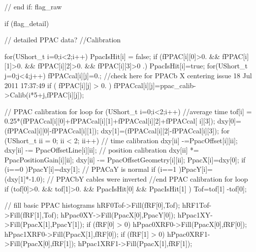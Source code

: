 \begin{DoxyCode}
{{{{{{{{{{        } // end if: flag_raw
        
        if (flag_detail) { // detailed PPAC data?
          //Calibration 
          
          for(UShort_t i=0;i<2;i++){
          PpacIsHit[i] = false;
          if (fPPAC[i][0]>0. && fPPAC[i][1]>0. && fPPAC[i][2]>0. && fPPAC[i][3]>0
      .) PpacIsHit[i]=true;
            for(UShort_t j=0;j<4;j++){
              fPPACcal[i][j]=0.;
              //check here for PPACb X centering issue 18 Jul 2011 17:37:49 
              if ( fPPAC[i][j] > 0. )  {
                fPPACcal[i][j]=ppac_calib->Calib(i*5+j,fPPAC[i][j]);
              }
            }    
          }

          // PPAC calibration for loop
          for (UShort_t i=0;i<2;i++){
            //average time
            tof[i] = 0.25*(fPPACcal[i][0]+fPPACcal[i][1]+fPPACcal[i][2]+fPPACcal[
      i][3]);
            dxy[0]=(fPPACcal[i][0]-fPPACcal[i][1]);
            dxy[1]=(fPPACcal[i][2]-fPPACcal[i][3]);
            for (UShort_t ii = 0; ii < 2; ii++) {
             // time calibration
              dxy[ii] -=PpacOffset[i][ii];
              dxy[ii] -= PpacOffsetLine[i][ii];
             // position calibration
              dxy[ii] *= PpacPositionGain[i][ii];
              dxy[ii] -= PpacOffsetGeometry[i][ii];
            }
              PpacX[i]=dxy[0];
              if (i==0 ){PpacY[i]=dxy[1];} // PPACaY is normal
              if (i==1 ){PpacY[i]=(dxy[1]*-1.0);} // PPACbY cables were inverted
          } //end PPAC calibration for loop
          if (tof[0]>0. && tof[1]>0. && PpacIsHit[0] && PpacIsHit[1] ) Tof=tof[1]
      -tof[0]; 
          
          // fill basic PPAC histograms
          hRF0Tof->Fill(fRF[0],Tof);
          hRF1Tof->Fill(fRF[1],Tof);
          hPpac0XY->Fill(PpacX[0],PpacY[0]);
          hPpac1XY->Fill(PpacX[1],PpacY[1]);
          if (fRF[0] > 0)
          {
            hPpac0XRF0->Fill(PpacX[0],fRF[0]);
            hPpac1XRF0->Fill(PpacX[1],fRF[0]);
          }
          if (fRF[1] > 0)
          {
            hPpac0XRF1->Fill(PpacX[0],fRF[1]);
            hPpac1XRF1->Fill(PpacX[1],fRF[1]);
          }
          
}}}}}}}}}}
\end{DoxyCode}
